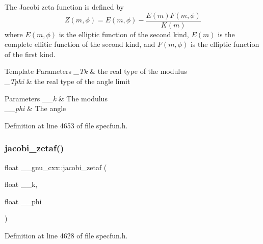 The Jacobi zeta function is defined by \[ Z(m,\phi) = E(m,\phi) - \frac{E(m)F(m,\phi)}{K(m)} \] where $ E(m,\phi) $ is the elliptic function of the second kind, $ E(m) $ is the complete ellitic function of the second kind, and $ F(m,\phi) $ is the elliptic function of the first kind.


\begin{DoxyTemplParams}{Template Parameters}
{\em \+\_\+\+Tk} & the real type of the modulus \\
\hline
{\em \+\_\+\+Tphi} & the real type of the angle limit \\
\hline
\end{DoxyTemplParams}

\begin{DoxyParams}{Parameters}
{\em \+\_\+\+\_\+k} & The modulus \\
\hline
{\em \+\_\+\+\_\+phi} & The angle \\
\hline
\end{DoxyParams}


Definition at line 4653 of file specfun.\+h.

\mbox{\label{group__mathsf__gnu_gaedb6b352331c67b9dea73660e2045668}} 
\subsubsection{\texorpdfstring{jacobi\+\_\+zetaf()}{jacobi\_zetaf()}}
{\footnotesize\ttfamily float \+\_\+\+\_\+gnu\+\_\+cxx\+::jacobi\+\_\+zetaf (\begin{DoxyParamCaption}\item[{float}]{\+\_\+\+\_\+k,  }\item[{float}]{\+\_\+\+\_\+phi }\end{DoxyParamCaption})\hspace{0.3cm}{\ttfamily [inline]}}



Definition at line 4628 of file specfun.\+h.

\mbox{\label{group__mathsf__gnu_ga9db158df9459aa12c840724338753913}} 
